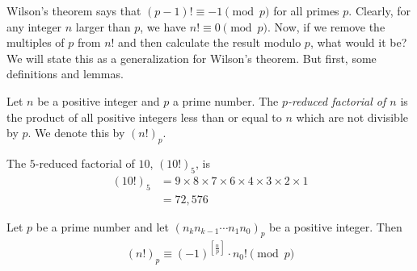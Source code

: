 \documentclass{subfile}
\begin{document}
Wilson's theorem says that $(p-1)! \equiv -1 \pmod p$ for all primes $p$. Clearly, for any integer $n$ larger than $p$, we have $n! \equiv 0 \pmod p$. Now, if we remove the multiples of $p$ from $n!$ and then calculate the result modulo $p$, what would it be? We will state this as a generalization for Wilson's theorem. But first, some definitions and lemmas.

	\begin{definition}
		Let $n$ be a positive integer and $p$ a prime number. The \textit{$p$-reduced factorial of $n$} is the product of all positive integers less than or equal to $n$ which are not divisible by $p$. We denote this by $(n!)_p$.
	\end{definition}

	\begin{example}
		The $5$-reduced factorial of $10$, $(10!)_5$, is
			\begin{align*}
				(10!)_5
					& = 9 \times 8 \times 7 \times 6 \times 4 \times 3 \times 2 \times 1\\
					& = 72,576
			\end{align*}
	\end{example}


	\begin{theorem}\label{thm:reducedfactorialmodp}
		Let $p$ be a prime number and let $(n_k n_{k-1}\cdots n_1 n_0)_p$ be a positive integer. Then
			\begin{align*}
				(n!)_p\equiv (-1)^{\left[\frac{n}{p}\right]} \cdot n_0!\pmod p
			\end{align*}
	\end{theorem}
\end{document}
